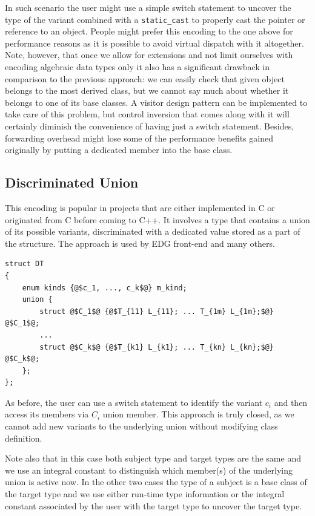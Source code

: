 \documentclass[preprint]{sigplanconf}
\makeatletter
\DeclareRobustCommand{\code}[1]{{\lstinline[breaklines=false,escapechar=@]{#1}}}
\makeatother
\begin{document}
In such scenario the user might use a simple switch statement to uncover the 
type of the variant combined with a \code{static_cast} to properly cast the 
pointer or reference to an object. People might prefer this encoding to the one 
above for performance reasons as it is possible to avoid virtual dispatch with 
it altogether. Note, however, that once we allow for extensions and not limit 
ourselves with encoding algebraic data types only it also has a significant 
drawback in comparison to the previous approach: we can easily check that given 
object belongs to the most derived class, but we cannot say much about whether 
it belongs to one of its base classes. A visitor design pattern can be 
implemented to take care of this problem, but control inversion that comes along 
with it will certainly diminish the convenience of having just a switch 
statement. Besides, forwarding overhead might lose some of the performance 
benefits gained originally by putting a dedicated member into the base class.

\subsection{Discriminated Union}
\label{sec:du}

This encoding is popular in projects that are either implemented in C or 
originated from C before coming to C++. It involves a type that contains a union 
of its possible variants, discriminated with a dedicated value stored as a part 
of the structure. The approach is used by EDG front-end\cite{EDG} and many others.

\begin{lstlisting}[keepspaces,columns=flexible]
struct DT
{
    enum kinds {@$c_1, ..., c_k$@} m_kind;
    union {
        struct @$C_1$@ {@$T_{11} L_{11}; ... T_{1m} L_{1m};$@} @$C_1$@;
        ...
        struct @$C_k$@ {@$T_{k1} L_{k1}; ... T_{kn} L_{kn};$@} @$C_k$@; 
    };
};
\end{lstlisting}

As before, the user can use a switch statement to identify the variant $c_i$ and 
then access its members via $C_i$ union member. This approach is truly closed, as 
we cannot add new variants to the underlying union without modifying class 
definition. 

Note also that in this case both subject type and target types are the same and 
we use an integral constant to distinguish which member(s) of the underlying union 
is active now. In the other two cases the type of a subject is a base class of 
the target type and we use either run-time type information or the integral 
constant associated by the user with the target type to uncover the target type. 
\end{document}
